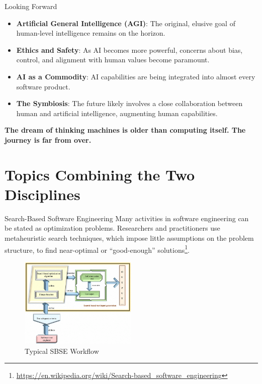 \documentclass{beamer}
\begin{document}
\begin{frame}[t]{Looking Forward}
\begin{itemize}
    \item \textbf{Artificial General Intelligence (AGI)}: The original, elusive goal of human-level intelligence remains on the horizon.
    \item \textbf{Ethics and Safety}: As AI becomes more powerful, concerns about bias, control, and alignment with human values become paramount.
    \item \textbf{AI as a Commodity}: AI capabilities are being integrated into almost every software product.
    \item \textbf{The Symbiosis}: The future likely involves a close collaboration between human and artificial intelligence, augmenting human capabilities.
\end{itemize}
\begin{center}
    \textbf{The dream of thinking machines is older than computing itself. The journey is far from over.}
\end{center}
\end{frame}

\section{Topics Combining the Two Disciplines}
\begin{frame}[t]{Search-Based Software Engineering}
    Many activities in software engineering can be stated as optimization problems. %
    Researchers and practitioners use metaheuristic search techniques, which impose little assumptions on the problem structure, to find near-optimal or ``good-enough'' solutions\footnote{\url{https://en.wikipedia.org/wiki/Search-based_software_engineering}}.
    \begin{figure}
    \begin{center}
        \includegraphics[width=0.5\textwidth]{images/Search-based-software-test-input-generation-method.png}
    \end{center}
    \caption{Typical SBSE Workflow}
    \end{figure}
    
\end{frame}
\end{document}

